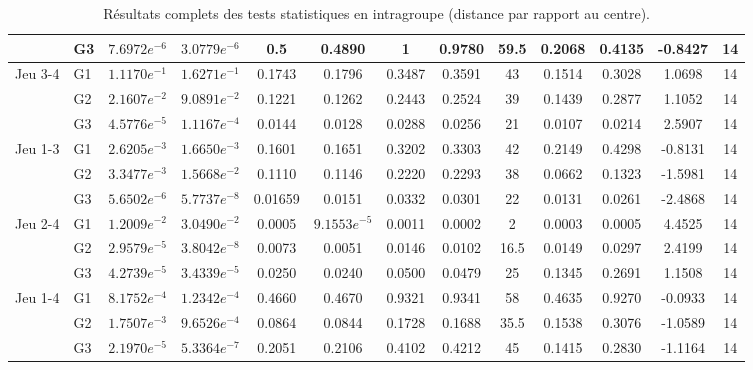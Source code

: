 {\begin{landscape}
\begin{table}[H]
\begin{tabular}{ll|cc|ccccc|cccc}
 & G3 & $7.6972e^{-6}$ & $3.0779e^{-6}$ & 0.5 & 0.4890 & 1 & 0.9780 & 59.5 & 0.2068 & 0.4135 & -0.8427 & 14 \\\hline
\multirow{3}{*}{Jeu 3-4} & G1 & $1.1170e^{-1}$ & $1.6271e^{-1}$ & 0.1743 & 0.1796 & 0.3487 & 0.3591 & 43 & 0.1514 & 0.3028 & 1.0698 & 14 \\
 & G2 & $2.1607e^{-2}$ & $9.0891e^{-2}$ & 0.1221 & 0.1262 & 0.2443 & 0.2524 & 39 & 0.1439 & 0.2877 & 1.1052 & 14 \\
 & G3 & $4.5776e^{-5}$ & $1.1167e^{-4}$ & 0.0144 & 0.0128 & 0.0288 & 0.0256 & 21 & 0.0107 & 0.0214 & 2.5907 & 14 \\\hline
\multirow{3}{*}{Jeu 1-3} & G1 & $2.6205e^{-3}$ & $1.6650e^{-3}$ & 0.1601 & 0.1651 & 0.3202 & 0.3303 & 42 & 0.2149 & 0.4298 & -0.8131 & 14 \\
 & G2 & $3.3477e^{-3}$ & $1.5668e^{-2}$ & 0.1110 & 0.1146 & 0.2220 & 0.2293 & 38 & 0.0662 & 0.1323 & -1.5981 & 14 \\
 & G3 & $5.6502e^{-6}$ & $5.7737e^{-8}$ & 0.01659 & 0.0151 & 0.0332 & 0.0301 & 22 & 0.0131 & 0.0261 & -2.4868 & 14 \\\hline
\multirow{3}{*}{Jeu 2-4} & G1 & $1.2009e^{-2}$ & $3.0490e^{-2}$ & 0.0005 & $9.1553e^{-5}$ & 0.0011 & 0.0002 & 2 & 0.0003 & 0.0005 & 4.4525 & 14 \\
 & G2 & $2.9579e^{-5}$ & $3.8042e^{-8}$ & 0.0073 & 0.0051 & 0.0146 & 0.0102 & 16.5 & 0.0149 & 0.0297 & 2.4199 & 14 \\
 & G3 & $4.2739e^{-5}$ & $3.4339e^{-5}$ & 0.0250 & 0.0240 & 0.0500 & 0.0479 & 25 & 0.1345 & 0.2691 & 1.1508 & 14 \\\hline
\multirow{3}{*}{Jeu 1-4} & G1 & $8.1752e^{-4}$ & $1.2342e^{-4}$ & 0.4660 & 0.4670 & 0.9321 & 0.9341 & 58 & 0.4635 & 0.9270 & -0.0933 & 14 \\
 & G2 & $1.7507e^{-3}$ & $9.6526e^{-4}$ & 0.0864 & 0.0844 & 0.1728 & 0.1688 & 35.5 & 0.1538 & 0.3076 & -1.0589 & 14 \\
 & G3 & $2.1970e^{-5}$ & $5.3364e^{-7}$ & 0.2051 & 0.2106 & 0.4102 & 0.4212 & 45 & 0.1415 & 0.2830 & -1.1164 & 14
\end{tabular}
\caption{Résultats complets des tests statistiques en intragroupe (distance par rapport au centre).}
\end{table}
\end{landscape}}

